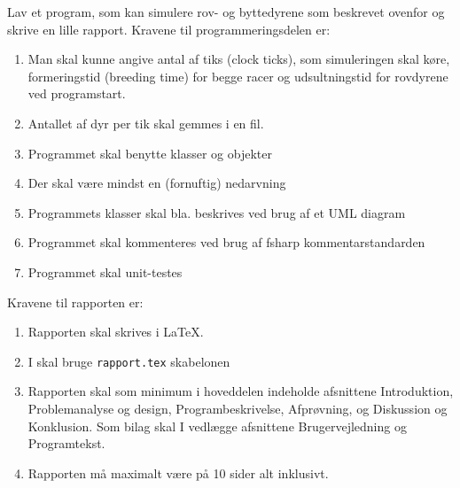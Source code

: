 Lav et program, som kan simulere rov- og byttedyrene som beskrevet ovenfor og skrive en lille rapport. Kravene til programmeringsdelen er:
\begin{enumerate}
\item Man skal kunne angive antal af tiks (clock ticks), som simuleringen skal køre, formeringstid (breeding time) for begge racer og udsultningstid for rovdyrene ved programstart.
\item Antallet af dyr per tik skal gemmes i en fil.
\item Programmet skal benytte klasser og objekter
\item Der skal være mindst en (fornuftig) nedarvning
\item Programmets klasser skal bla. beskrives ved brug af et UML diagram
\item Programmet skal kommenteres ved brug af fsharp kommentarstandarden
\item Programmet skal unit-testes
\end{enumerate}
Kravene til rapporten er:
\begin{enumerate}[resume]
\item Rapporten skal skrives i \LaTeX.
\item I skal bruge \texttt{rapport.tex} skabelonen
\item Rapporten skal som minimum i hoveddelen indeholde afsnittene Introduktion, Problemanalyse og design, Programbeskrivelse, Afprøvning, og Diskussion og Konklusion. Som bilag skal I vedlægge afsnittene Brugervejledning og Programtekst.
\item Rapporten må maximalt være på 10 sider alt inklusivt.
\end{enumerate}
